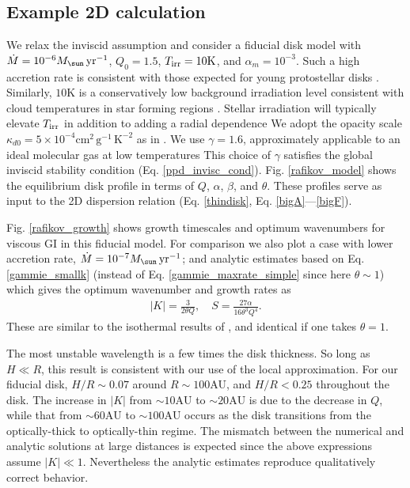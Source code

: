 \subsection{Example 2D calculation}\label{pp2d_example}
We relax the inviscid assumption and consider a fiducial disk  model with
$\dot{M} = 10^{-6}M_\sun\,\yr^{-1}$, $Q_0=1.5$,  
$T_\mathrm{irr}=10\mathrm{K}$, and $\alpha_m=10^{-3}$. 
Such a high accretion rate is consistent with those expected for 
young protostellar disks \citep{shu77,enoch09}. Similarly,
$10\mathrm{K}$ is a conservatively low background irradiation level
consistent with cloud temperatures in star forming regions
\citep{plume97,johnstone01}. 
Stellar irradiation will typically elevate $T_\mathrm{irr}$ in addition to
adding a radial dependence \citep{kratter08} 
We adopt the opacity scale $\kappa_{d0} =
5\times10^{-4}\mathrm{cm}^2\,\mathrm{g}^{-1}\,\mathrm{K}^{-2}$  as in
. We use $\gamma=1.6$, approximately applicable
to an ideal molecular gas at low temperatures 
This choice of $\gamma$ satisfies the global inviscid stability condition
(Eq. \ref{ppd_invisc_cond}). %
Fig. \ref{rafikov_model} shows the equilibrium 
disk profile in terms of $Q$, $\alpha$, $\beta$, and $\theta$.  
These profiles serve as input to the 2D dispersion relation
(Eq. \ref{thindisk}, Eq. \ref{bigA}---\ref{bigF}). 

Fig. \ref{rafikov_growth} shows growth timescales and
optimum wavenumbers for viscous GI in this fiducial model. For
comparison we also plot a case with lower accretion rate, 
$\dot{M}=10^{-7}M_\sun\,\yr^{-1}$; and analytic estimates based on
Eq. \ref{gammie_smallk} (instead of Eq. \ref{gammie_maxrate_simple}
since here $\theta\sim 1$) which gives the optimum wavenumber and
growth rates as 
\begin{align}
  |K| = \frac{3}{2\theta Q}, \quad
  S = \frac{27\alpha}{16\theta^3Q^4}. 
\end{align}
These are similar to the isothermal results of
\citet[][their Eq. 19 and 21, respectively]{sterzik95}, and identical if one
takes $\theta=1$. %
 
The most unstable wavelength is a few times the disk thickness. 
So long as $H\ll R$, this result is consistent with our use of the
local approximation. For our fiducial disk, $H/R \sim 0.07$ around 
$R\sim 100$AU, and $H/R <0.25$ throughout the disk. 
The increase in $|K|$ from 
$\sim 10\mathrm{AU}$ to $\sim 20\mathrm{AU}$ is due to the decrease in
$Q$, while that from $\sim 
60\mathrm{AU}$ to $\sim 100\mathrm{AU}$ occurs as the disk transitions
from the 
optically-thick to optically-thin regime. The mismatch between the
numerical and analytic solutions at large
distances is expected since the above expressions assume $|K|\ll
1$. Nevertheless the analytic estimates reproduce qualitatively correct
behavior. 

